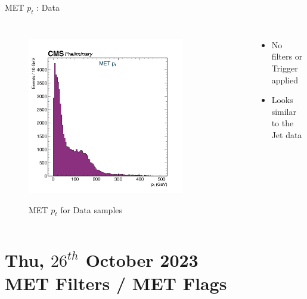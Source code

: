 \documentclass[10pt,xcolor=dvipsnames,aspectratio=169]{beamer}
\begin{document}
    
   \begin{frame}[fragile]{MET $p_t$ : Data} 
    \begin{columns}
    \begin{figure} 
    \centering 
     \includegraphics[width=0.8\textwidth]{../Archive/KinemPlots/METData.png }
    \label{METData} 
    \caption{MET $p_t$ for Data samples}
    \end{figure} 
    \begin{itemize} 
    \raggedright 
    \small
    \item No filters or Trigger applied
    \item Looks similar to the Jet data
    \end{itemize}
    \end{columns} 
    \end{frame}


\section[MET Filters ]{\small{Thu, $26^{th}$ October 2023 } \\ MET Filters / MET Flags}
\end{document}
